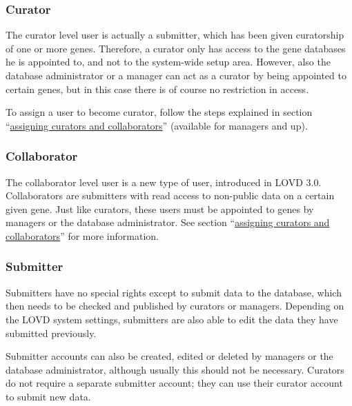 \documentclass[a4paper,oneside,openany,12pt]{memoir}
\begin{document}
\subsubsection{Curator}
The curator level user is actually a submitter, which has been given curatorship of one or more genes.
Therefore, a curator only has access to the gene databases he is appointed to, and not to the system-wide setup area.
However, also the database administrator or a manager can act as a curator by being appointed to certain genes,
 but in this case there is of course no restriction in access.
\\
\par
To assign a user to become curator, follow the steps explained in section
 ``\hyperlink{s_gene_assign_curators}{assigning curators and collaborators}'' (available for managers and up).

\subsubsection{Collaborator}
The collaborator level user is a new type of user, introduced in LOVD 3.0.
Collaborators are submitters with read access to non-public data on a certain given gene.
Just like curators, these users must be appointed to genes by managers or the database administrator.
See section ``\hyperlink{s_gene_assign_curators}{assigning curators and collaborators}'' for more information.

\subsubsection{Submitter}
Submitters have no special rights except to submit data to the database, which then needs to be checked and published by curators or managers.
Depending on the LOVD system settings, submitters are also able to edit the data they have submitted previously.
\par
Submitter accounts can also be created, edited or deleted by managers or the database administrator, although usually this should not be necessary.
Curators do not require a separate submitter account; they can use their curator account to submit new data.






\end{document}
